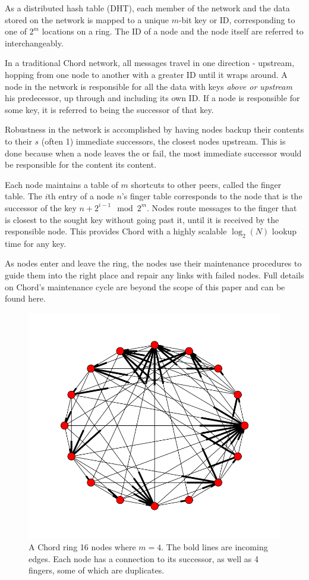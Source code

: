 As a distributed hash table (DHT), each member of the network and the data stored on the network is mapped to a unique $m$-bit key or ID, corresponding to one of  $2^m$ locations on a ring. 
The ID of a node and the node itself are referred to interchangeably.

In a traditional Chord network, all messages travel in one direction - upstream, hopping from one node to another with a greater ID until it wraps around.
A node in the network is responsible for all the data with keys \textit{above or upstream} his predecessor, up through and including its own ID.  If a node is responsible for some key, it is referred to being the successor of that key.

Robustness in the network is accomplished by having nodes backup their contents to their $s$ (often 1) immediate successors, the closest nodes upstream.  
This is done because when a node leaves the or fail, the most immediate successor would be responsible for the content its content.

Each node maintains a table of $m$ shortcuts to other peers, called the finger table.   The $i$th entry of a node $n$'s finger table corresponds to the node that is the successor of the key $n+2^{i-1} \mod 2^m $.  Nodes route messages to the finger that is closest to the sought key without going past it, until it is received by the responsible node.  This provides Chord with a highly scalable $\log_2(N)$ lookup time for any key\cite{chord}.

As nodes enter and leave the ring, the nodes use their maintenance procedures to guide them into the right place and repair any links with failed nodes.  Full details on Chord's maintenance cycle are beyond the scope of this paper and can be found here\cite{chord}.

\begin{figure}
	\includegraphics[width=0.5\linewidth]{chordreal}
	\caption{A Chord ring 16 nodes where $m=4$.  The bold lines are incoming edges.  Each node has a connection to its successor, as well as 4 fingers, some of which are duplicates.}
	\label{chordreal}
\end{figure}


